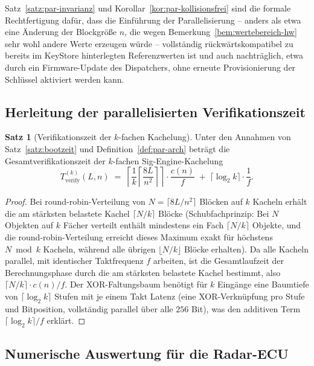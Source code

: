 ﻿\documentclass[a4paper,12pt]{article}
\theoremstyle{definition}
\newtheorem{satz}{Satz}
\begin{document}
Satz~\ref{satz:par-invarianz} und Korollar~\ref{kor:par-kollisionsfrei} sind die formale Rechtfertigung dafür, dass die Einführung der Parallelisierung -- anders als etwa eine Änderung der Blockgröße $n$, die wegen Bemerkung~\ref{bem:wertebereich-hw} sehr wohl andere Werte erzeugen würde -- vollständig rückwärtskompatibel zu bereits im KeyStore hinterlegten Referenzwerten ist und auch nachträglich, etwa durch ein Firmware-Update des Dispatchers, ohne erneute Provisionierung der Schlüssel aktiviert werden kann.

\subsection{Herleitung der parallelisierten Verifikationszeit}

\begin{satz}[Verifikationszeit der $k$-fachen Kachelung]
	\label{satz:par-zeit}
	Unter den Annahmen von Satz~\ref{satz:bootzeit} und Definition~\ref{def:par-arch} beträgt die Gesamtverifikationszeit der $k$-fachen Sig-Engine-Kachelung
	\[
	T_{\mathrm{verify}}^{(k)}(L,n) \;=\; \left\lceil \frac{1}{k}\left\lceil \frac{8L}{n^2}\right\rceil\right\rceil \cdot \frac{c(n)}{f} \;+\; \lceil \log_2 k\rceil \cdot \frac{1}{f}.
	\]
\end{satz}

\begin{proof}
	Bei round-robin-Verteilung von $N = \lceil 8L/n^2\rceil$ Blöcken auf $k$ Kacheln erhält die am stärksten belastete Kachel $\lceil N/k\rceil$ Blöcke (Schubfachprinzip: Bei $N$ Objekten auf $k$ Fächer verteilt enthält mindestens ein Fach $\lceil N/k\rceil$ Objekte, und die round-robin-Verteilung erreicht dieses Maximum exakt für höchstens $N \bmod k$ Kacheln, während alle übrigen $\lfloor N/k\rfloor$ Blöcke erhalten). Da alle Kacheln parallel, mit identischer Taktfrequenz $f$ arbeiten, ist die Gesamtlaufzeit der Berechnungsphase durch die am stärksten belastete Kachel bestimmt, also $\lceil N/k\rceil \cdot c(n)/f$. Der XOR-Faltungsbaum benötigt für $k$ Eingänge eine Baumtiefe von $\lceil \log_2 k\rceil$ Stufen mit je einem Takt Latenz (eine XOR-Verknüpfung pro Stufe und Bitposition, vollständig parallel über alle $256$ Bit), was den additiven Term $\lceil \log_2 k\rceil / f$ erklärt. \qedhere
\end{proof}

\subsection{Numerische Auswertung für die Radar-ECU}
\end{document}
